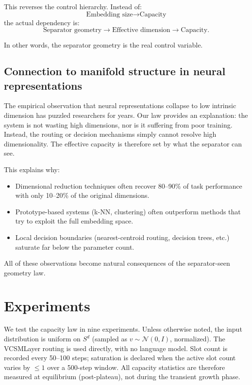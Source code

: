 \documentclass[11pt]{article}
\begin{document}
This reverses the control hierarchy. Instead of:
\[
  \text{Embedding size} \rightarrow \text{Capacity}
\]
the actual dependency is:
\[
  \text{Separator geometry} \rightarrow \text{Effective dimension} \rightarrow \text{Capacity}.
\]

In other words, the separator geometry is the real control variable.

\subsection{Connection to manifold structure in neural representations}

The empirical observation that neural representations collapse to low intrinsic dimension has puzzled researchers
for years. Our law provides an explanation: the system is not wasting high dimensions, nor is it suffering from
poor training. Instead, the routing or decision mechanisms simply cannot resolve high dimensionality.
The effective capacity is therefore set by what the separator can see.

This explains why:
\begin{itemize}
  \item Dimensional reduction techniques often recover 80--90\% of task performance with only 10--20\% of the original dimensions.
  \item Prototype-based systems (k-NN, clustering) often outperform methods that try to exploit the full embedding space.
  \item Local decision boundaries (nearest-centroid routing, decision trees, etc.) saturate far below the parameter count.
\end{itemize}

All of these observations become natural consequences of the separator-seen geometry law.

\section{Experiments}
\label{sec:experiments}

We test the capacity law in nine experiments.
Unless otherwise noted, the input distribution is uniform on $S^{d}$ (sampled as
$v \sim \mathcal{N}(0,I)$, normalized).
The VCSMLayer routing is used directly, with no language model.
Slot count is recorded every 50--100 steps; saturation is declared when
the active slot count varies by $\leq 1$ over a 500-step window.
All capacity statistics are therefore measured at equilibrium (post-plateau),
not during the transient growth phase.
\end{document}
